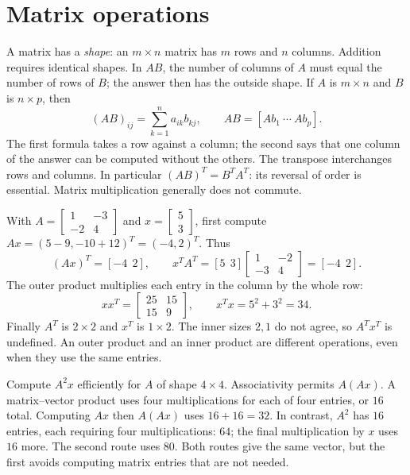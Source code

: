 \section{Matrix operations}
A matrix has a \emph{shape}: an $m\times n$ matrix has $m$ rows and $n$
columns. Addition requires identical shapes. In $AB$, the number of columns
of $A$ must equal the number of rows of $B$; the answer then has the outside
shape. If $A$ is $m\times n$ and $B$ is $n\times p$, then
\[
 (AB)_{ij}=\sum_{k=1}^n a_{ik}b_{kj},\qquad
 AB=[Ab_1\ \cdots\ Ab_p].
\]
The first formula takes a row against a column; the second says that one
column of the answer can be computed without the others. The transpose
interchanges rows and columns. In particular $(AB)^T=B^TA^T$: its reversal
of order is essential. Matrix multiplication generally does not commute.

With $A=\begin{bmatrix}1&-3\\-2&4\end{bmatrix}$ and
$x=\begin{bmatrix}5\\3\end{bmatrix}$, first compute
$Ax=(5-9,-10+12)^T=(-4,2)^T$. Thus
\[
 (Ax)^T=[-4\ \ 2],\qquad
 x^TA^T=[5\ \ 3]\begin{bmatrix}1&-2\\-3&4\end{bmatrix}=[-4\ \ 2].
\]
The outer product multiplies each entry in the column by the whole row:
\[
 xx^T=\begin{bmatrix}25&15\\15&9\end{bmatrix},\qquad
 x^Tx=5^2+3^2=34.
\]
Finally $A^T$ is $2\times2$ and $x^T$ is $1\times2$. The inner sizes $2,1$
do not agree, so $A^Tx^T$ is undefined. An outer product and an inner product
are different operations, even when they use the same entries.

\goal Compute $A^2x$ efficiently for $A$ of shape $4\times4$.
Associativity permits $A(Ax)$. A matrix--vector product uses four
multiplications for each of four entries, or $16$ total. Computing $Ax$
then $A(Ax)$ uses $16+16=32$. In contrast, $A^2$ has $16$ entries, each
requiring four multiplications: $64$; the final multiplication by $x$ uses
$16$ more. The second route uses $80$. Both routes give the same vector,
but the first avoids computing matrix entries that are not needed.

